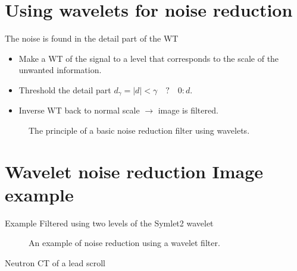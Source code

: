 \documentclass[letterpaper,10pt,english]{sphinxmanual}
\begin{document}
\section{Using wavelets for noise reduction}
\label{\detokenize{02-ImageEnhancement:using-wavelets-for-noise-reduction}}
\sphinxAtStartPar
The noise is found in the detail part of the WT
\begin{itemize}
\item {} 
\sphinxAtStartPar
Make a WT of the signal to a level that corresponds to the scale of the unwanted information.

\item {} 
\sphinxAtStartPar
Threshold the detail part \(d_{\gamma}=|d|<\gamma\quad ? \quad 0 : d\).

\item {} 
\sphinxAtStartPar
Inverse WT back to normal scale \(\rightarrow\) image is filtered.

\end{itemize}

\begin{figure}[htbp]
\centering
\capstart

\noindent{}
\caption{The principle of a basic noise reduction filter using wavelets.}\label{\detokenize{02-ImageEnhancement:id22}}\end{figure}




\section{Wavelet noise reduction \sphinxhyphen{} Image example}
\label{\detokenize{02-ImageEnhancement:wavelet-noise-reduction-image-example}}
\sphinxAtStartPar
Example Filtered using two levels of the Symlet\sphinxhyphen{}2 wavelet

\begin{figure}[htbp]
\centering
\capstart

\noindent{}
\caption{An example of noise reduction using a wavelet filter.}\label{\detokenize{02-ImageEnhancement:id23}}\end{figure}

\sphinxAtStartPar
{} Neutron CT of a lead scroll
\end{document}
